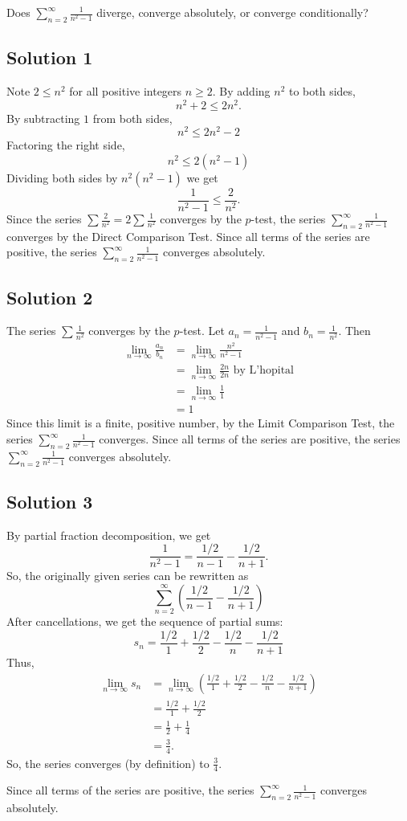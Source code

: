 \documentclass{article}
\begin{document}
\noindent
Does $\displaystyle \sum_{n=2}^\infty \frac{1}{n^2-1}$
diverge, converge absolutely, or converge conditionally?

\subsection*{Solution 1}

Note $2 \leq n^2$ for all positive integers $n \geq 2$. By adding $n^2$ to both sides,
\[ n^2 + 2 \leq 2n^2.\]
By subtracting $1$ from both sides,
\[ n^2 \leq 2n^2-2\]
Factoring the right side,
\[ n^2 \leq 2(n^2-1)\]
Dividing both sides by $n^2(n^2-1)$ we get
\[ \frac{1}{n^2-1} \leq \frac{2}{n^2}.\]
Since the series $\sum \frac{2}{n^2}=2\sum\frac{1}{n^2}$ converges by the $p$-test, the series $\displaystyle \sum_{n=2}^\infty \frac{1}{n^2-1}$ converges by the Direct Comparison Test.
Since all terms of the series are positive, the series $\displaystyle \sum_{n=2}^\infty \frac{1}{n^2-1}$ converges absolutely.

\subsection*{Solution 2}

The series $\sum \frac1{n^2}$ converges by the $p$-test. Let $a_n = \frac1{n^2-1}$ and $b_n=\frac1{n^2}$. Then
\begin{align*}
\lim_{n \to \infty} \frac{a_n}{b_n}
&= \lim_{n \to \infty} \frac{n^2}{n^2-1}\\
&= \lim_{n \to \infty} \frac{2n}{2n} \text{ by L'hopital}\\
&= \lim_{n \to \infty} \frac11\\
&= 1
\end{align*}
Since this limit is a finite, positive number, by the Limit Comparison Test, the series $\displaystyle \sum_{n=2}^\infty \frac{1}{n^2-1}$ converges.
Since all terms of the series are positive, the series $\displaystyle \sum_{n=2}^\infty \frac{1}{n^2-1}$ converges absolutely.

\subsection*{Solution 3}

By partial fraction decomposition, we get
\[ \frac1{n^2-1} = \frac{1/2}{n-1} - \frac{1/2}{n+1}.\]
So, the originally given series can be rewritten as
\[\sum_{n=2}^\infty \left(\frac{1/2}{n-1} - \frac{1/2}{n+1}\right)\]
After cancellations, we get the sequence of partial sums:
\[ s_n = \frac{1/2}{1} + \frac{1/2}{2} - \frac{1/2}{n} - \frac{1/2}{n+1}\]
Thus,
\begin{align*}
\lim_{n \to \infty} s_n
&= \lim_{n \to \infty} \left(\frac{1/2}{1} + \frac{1/2}{2} - \frac{1/2}{n} - \frac{1/2}{n+1}\right)\\
&= \frac{1/2}{1} + \frac{1/2}{2}\\
&= \frac12 + \frac14\\
&= \frac34.
\end{align*}
So, the series converges (by definition) to $\frac34$.

Since all terms of the series are positive, the series $\displaystyle \sum_{n=2}^\infty \frac{1}{n^2-1}$ converges absolutely.
\end{document}
